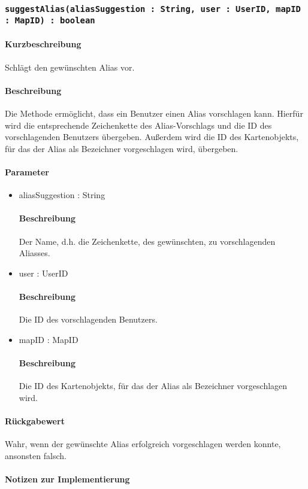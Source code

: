 \subsubsection{\texttt{suggestAlias(aliasSuggestion : String, user : UserID, mapID : MapID) : boolean}}%
\paragraph*{Kurzbeschreibung}
Schlägt den gewünschten Alias vor.
\paragraph*{Beschreibung}
Die Methode ermöglicht, dass ein Benutzer einen Alias vorschlagen kann. 
Hierfür wird die entsprechende Zeichenkette des Alias-Vorschlags und die ID des vorschlagenden Benutzers übergeben.
Außerdem wird die ID des Kartenobjekts, für das der Alias als Bezeichner vorgeschlagen wird, übergeben.
\paragraph*{Parameter}
\begin{itemize}
	\item aliasSuggestion : String
		\paragraph*{Beschreibung}
		Der Name, d.h. die Zeichenkette, des gewünschten, zu vorschlagenden Aliasses.
	\item user : UserID
		\paragraph*{Beschreibung}
		Die ID des vorschlagenden Benutzers.
	\item mapID : MapID
		\paragraph*{Beschreibung}
		Die ID des Kartenobjekts, für das der Alias als Bezeichner vorgeschlagen wird.
\end{itemize}
\paragraph*{Rückgabewert}
Wahr, wenn der gewünschte Alias erfolgreich vorgeschlagen werden konnte, ansonsten falsch.

\paragraph*{Notizen zur Implementierung}%
